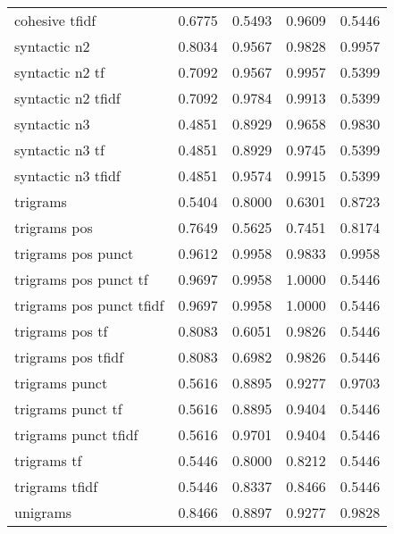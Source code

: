 \documentclass{article}
\begin{document}
\begin{table}
\begin{tabular}{lrrrr}
cohesive tfidf             & 0.6775 &       0.5493 &         0.9609 &               0.5446 \\
syntactic n2               & 0.8034 &       0.9567 &         0.9828 &               0.9957 \\
syntactic n2 tf            & 0.7092 &       0.9567 &         0.9957 &               0.5399 \\
syntactic n2 tfidf         & 0.7092 &       0.9784 &         0.9913 &               0.5399 \\
syntactic n3               & 0.4851 &       0.8929 &         0.9658 &               0.9830 \\
syntactic n3 tf            & 0.4851 &       0.8929 &         0.9745 &               0.5399 \\
syntactic n3 tfidf         & 0.4851 &       0.9574 &         0.9915 &               0.5399 \\
trigrams                   & 0.5404 &       0.8000 &         0.6301 &               0.8723 \\
trigrams pos               & 0.7649 &       0.5625 &         0.7451 &               0.8174 \\
trigrams pos punct         & 0.9612 &       0.9958 &         0.9833 &               0.9958 \\
trigrams pos punct tf      & 0.9697 &       0.9958 &         1.0000 &               0.5446 \\
trigrams pos punct tfidf   & 0.9697 &       0.9958 &         1.0000 &               0.5446 \\
trigrams pos tf            & 0.8083 &       0.6051 &         0.9826 &               0.5446 \\
trigrams pos tfidf         & 0.8083 &       0.6982 &         0.9826 &               0.5446 \\
trigrams punct             & 0.5616 &       0.8895 &         0.9277 &               0.9703 \\
trigrams punct tf          & 0.5616 &       0.8895 &         0.9404 &               0.5446 \\
trigrams punct tfidf       & 0.5616 &       0.9701 &         0.9404 &               0.5446 \\
trigrams tf                & 0.5446 &       0.8000 &         0.8212 &               0.5446 \\
trigrams tfidf             & 0.5446 &       0.8337 &         0.8466 &               0.5446 \\
unigrams                   & 0.8466 &       0.8897 &         0.9277 &               0.9828 \\

\end{tabular}
\end{table}
\end{document}
